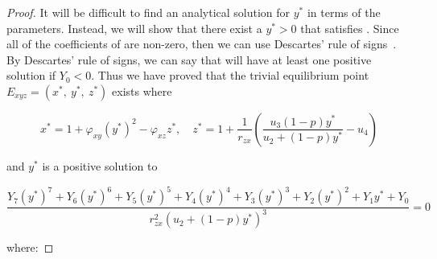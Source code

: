 \begin{proof}
    It will be difficult to find an analytical solution for $y^*$ in terms of the parameters. Instead, we will show that there exist a $y^*>0$ that satisfies . Since all of the coefficients of  are non-zero, then we can use Descartes' rule of signs~\cite{WANG2004525526}. By Descartes' rule of signs, we can say that  will have at least one positive solution if $Y_0<0$. Thus we have proved that the trivial equilibrium point $E_{xyz}=\left(x^*,\ y^*,\ z^*\right)$ exists where
    
    \begin{equation*}
        x^*=1+\varphi_{xy}\left(y^*\right)^2-\varphi_{xz}z^*,\quad z^*=1+\frac{1}{r_{zx}}\left(\frac{u_3\left(1-p\right)y^*}{u_2+\left(1-p\right)y^*}-u_4\right)
    \end{equation*}

    and $y^*$ is a positive solution to 

    \begin{equation*}
        \frac{Y_7\left(y^*\right)^7+Y_6\left(y^*\right)^6+Y_5\left(y^*\right)^5+Y_4\left(y^*\right)^4+Y_3\left(y^*\right)^3+Y_2\left(y^*\right)^2+Y_1y^*+Y_0}{r_{zx}^2\left(u_2+\left(1-p\right)y^*\right)^3}=0
    \end{equation*}

    where:


\end{proof}
